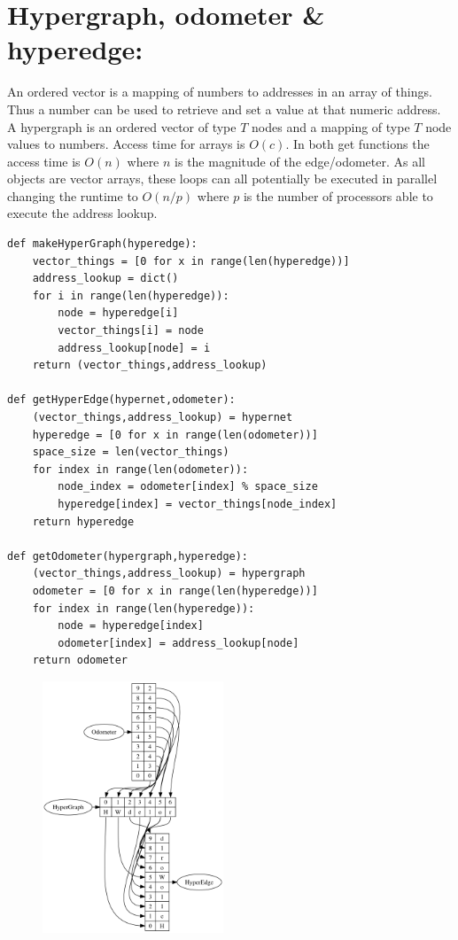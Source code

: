 \documentclass[12pt]{article}
\begin{document}
\newpage

\section{Hypergraph, odometer \& hyperedge:}
An ordered vector is a mapping of numbers to addresses in an array of things. Thus a number can be used to retrieve and set a value at that numeric address. A hypergraph is an ordered vector of type $T$ nodes and a mapping of type $T$ node values to numbers. Access time for arrays is $O(c)$. In both get functions the access time is $O(n)$ where $n$ is the magnitude of the edge/odometer. As all objects are vector arrays, these loops can all potentially be executed in parallel changing the runtime to $O(n/p)$ where $p$ is the number of processors able to execute the address lookup.
\begin{lstlisting}
def makeHyperGraph(hyperedge):
    vector_things = [0 for x in range(len(hyperedge))]
    address_lookup = dict()
    for i in range(len(hyperedge)):
        node = hyperedge[i]
        vector_things[i] = node
        address_lookup[node] = i
    return (vector_things,address_lookup)

def getHyperEdge(hypernet,odometer):
    (vector_things,address_lookup) = hypernet
    hyperedge = [0 for x in range(len(odometer))]
    space_size = len(vector_things)
    for index in range(len(odometer)):
        node_index = odometer[index] % space_size
        hyperedge[index] = vector_things[node_index]
    return hyperedge
    
def getOdometer(hypergraph,hyperedge):
    (vector_things,address_lookup) = hypergraph
    odometer = [0 for x in range(len(hyperedge))]
    for index in range(len(hyperedge)):
        node = hyperedge[index]
        odometer[index] = address_lookup[node]
    return odometer
\end{lstlisting}
\newpage
\begin{figure}
  \begin{center}
    \includegraphics[width=0.48\textwidth]{odometers}
  \end{center}
\end{figure}
\end{document}
